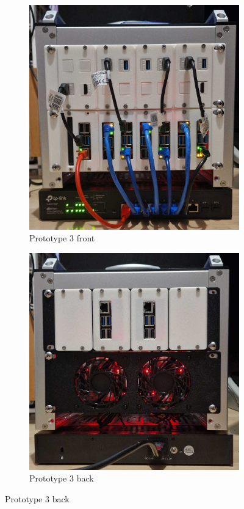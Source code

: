 \begin{frame}
\begin{figure}
\begin{subfigure}[b]{0.24\textwidth}
			\includegraphics[width=\textwidth]{graphics/mini-HPC-proto3.png}
			\caption{Prototype 3 front}
			\label{fig:2.c}
		\end{subfigure}
		\hfill
		\begin{subfigure}[b]{0.24\textwidth}
			\centering
			\includegraphics[width=\textwidth]{graphics/mini-HPC-proto3_back.png}
			\caption{Prototype 3 back}
			\label{fig:2.d}
		\end{subfigure}

		\label{fig:2}
	\end{figure}
	
\end{frame}
